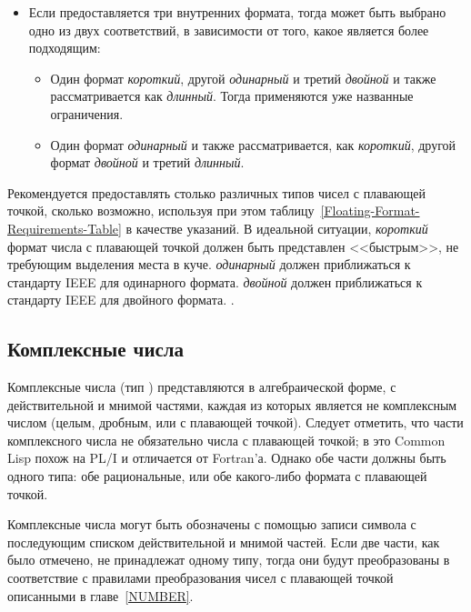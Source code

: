 \begin{itemize}
\item 
Если предоставляется три внутренних формата, тогда может быть выбрано одно
из двух соответствий, в зависимости от того, какое является более подходящим:
\begin{itemize}
\item 
Один формат \emph{короткий}, другой \emph{одинарный} и третий \emph{двойной} и
также рассматривается как \emph{длинный}. Тогда применяются уже названные
ограничения.

\item 
Один формат \emph{одинарный} и также рассматривается, как \emph{короткий},
другой формат \emph{двойной} и третий \emph{длинный}.
\end{itemize}

\end{itemize}

\beforenoterule
\begin{implementation}
Рекомендуется предоставлять столько различных типов чисел с плавающей точкой,
сколько возможно, используя при этом
таблицу~\ref{Floating-Format-Requirements-Table} в качестве указаний.
В идеальной ситуации, \emph{короткий} формат числа с плавающей точкой должен
быть представлен <<быстрым>>, не требующим выделения места в куче.
\emph{одинарный} должен приближаться к стандарту IEEE для одинарного формата.
\emph{двойной} должен приближаться к стандарту IEEE для двойного формата.
\cite{IEEE-PROPOSED-FLOATING-POINT-STANDARD,IEEE-FLOATING-POINT-IMPL-GUIDE,IEEE-FLOATING-POINT-IMPL-GUIDE-ERRATA}.
\end{implementation}
\afternoterule

\subsection{Комплексные числа}

Комплексные числа (тип )
представляются в алгебраической форме, с действительной и мнимой частями, каждая
из которых является не комплексным числом (целым, дробным, или с плавающей
точкой). Следует отметить, что части комплексного числа не
обязательно числа с плавающей точкой; в это Common Lisp похож на PL/I и
отличается от Fortran'а. Однако обе части должны быть одного типа: обе
рациональные, или обе какого-либо формата с плавающей точкой.

Комплексные числа могут быть обозначены с помощью записи символа  с
последующим списком действительной и мнимой частей.
Если две части, как было отмечено, не принадлежат одному типу, тогда они будут
преобразованы в соответствие с правилами преобразования чисел с плавающей точкой
описанными в главе~\ref{NUMBER}.

